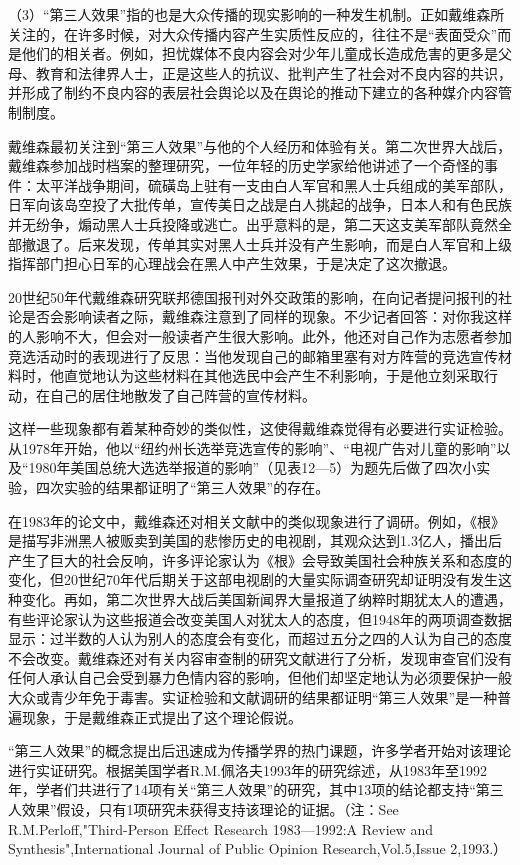 \documentclass[UTF8,12pt]{ctexart}
\numberwithin{equation}{section} %
\numberwithin{figure}{section}
\numberwithin{table}{section}
\begin{document}
	（3）“第三人效果”指的也是大众传播的现实影响的一种发生机制。正如戴维森所关注的，在许多时候，对大众传播内容产生实质性反应的，往往不是“表面受众”而是他们的相关者。例如，担忧媒体不良内容会对少年儿童成长造成危害的更多是父母、教育和法律界人士，正是这些人的抗议、批判产生了社会对不良内容的共识，并形成了制约不良内容的表层社会舆论以及在舆论的推动下建立的各种媒介内容管制制度。
	
	戴维森最初关注到“第三人效果”与他的个人经历和体验有关。第二次世界大战后，戴维森参加战时档案的整理研究，一位年轻的历史学家给他讲述了一个奇怪的事件：太平洋战争期间，硫磺岛上驻有一支由白人军官和黑人士兵组成的美军部队，日军向该岛空投了大批传单，宣传美日之战是白人挑起的战争，日本人和有色民族并无纷争，煽动黑人士兵投降或逃亡。出乎意料的是，第二天这支美军部队竟然全部撤退了。后来发现，传单其实对黑人士兵并没有产生影响，而是白人军官和上级指挥部门担心日军的心理战会在黑人中产生效果，于是决定了这次撤退。
	
	20世纪50年代戴维森研究联邦德国报刊对外交政策的影响，在向记者提问报刊的社论是否会影响读者之际，戴维森注意到了同样的现象。不少记者回答：对你我这样的人影响不大，但会对一般读者产生很大影响。此外，他还对自己作为志愿者参加竞选活动时的表现进行了反思：当他发现自己的邮箱里塞有对方阵营的竞选宣传材料时，他直觉地认为这些材料在其他选民中会产生不利影响，于是他立刻采取行动，在自己的居住地散发了自己阵营的宣传材料。
	
	这样一些现象都有着某种奇妙的类似性，这使得戴维森觉得有必要进行实证检验。从1978年开始，他以“纽约州长选举竞选宣传的影响”、“电视广告对儿童的影响”以及“1980年美国总统大选选举报道的影响”（见表12—5）为题先后做了四次小实验，四次实验的结果都证明了“第三人效果”的存在。
	
	在1983年的论文中，戴维森还对相关文献中的类似现象进行了调研。例如，《根》是描写非洲黑人被贩卖到美国的悲惨历史的电视剧，其观众达到1.3亿人，播出后产生了巨大的社会反响，许多评论家认为《根》会导致美国社会种族关系和态度的变化，但20世纪70年代后期关于这部电视剧的大量实际调查研究却证明没有发生这种变化。再如，第二次世界大战后美国新闻界大量报道了纳粹时期犹太人的遭遇，有些评论家认为这些报道会改变美国人对犹太人的态度，但1948年的两项调查数据显示：过半数的人认为别人的态度会有变化，而超过五分之四的人认为自己的态度不会改变。戴维森还对有关内容审查制的研究文献进行了分析，发现审查官们没有任何人承认自己会受到暴力色情内容的影响，但他们却坚定地认为必须要保护一般大众或青少年免于毒害。实证检验和文献调研的结果都证明“第三人效果”是一种普遍现象，于是戴维森正式提出了这个理论假说。
	
	“第三人效果”的概念提出后迅速成为传播学界的热门课题，许多学者开始对该理论进行实证研究。根据美国学者R.M.佩洛夫1993年的研究综述，从1983年至1992年，学者们共进行了14项有关“第三人效果”的研究，其中13项的结论都支持“第三人效果”假设，只有1项研究未获得支持该理论的证据。（注：See R.M.Perloff,"Third-Person Effect Research 1983—1992:A Review and Synthesis",International Journal of Public Opinion Research,Vol.5,Issue 2,1993.）
	
\end{document}

